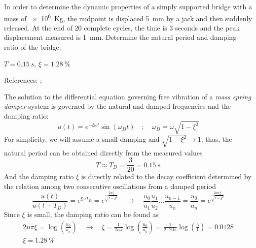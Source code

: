 
\begin{Exercise}[label={free_vibration}]
In order to determine the dynamic properties of a simply supported bridge with a mass of \qty{e6}{Kg}, the midpoint is displaced \qty{5}{mm} by a jack and then suddenly released. At the end of 20 complete cycles, the time is 3 seconds and the peak displacement measured is \qty{1}{mm}. Determine the natural period and damping ratio of the bridge.

\begin{center}
\end{center}

\shortAnswer $T=\SI{0.15}{s}$, $\xi=\SI{1.28}{\%}$

References: \cite[page 49]{chopra}; \cite[page 287]{blanco}
\end{Exercise}



\begin{Answer}[ref={free_vibration}]
The solution to the differential equation governing free vibration of a \emph{mass spring damper} system is governed by the natural and damped frequencies and the damping ratio:
$$
u(t) = e^{-\xi\omega t}\sin(\omega_D t) \quad ; \quad \omega_D = \omega\sqrt{1-\xi^2}
$$
For simplicity, we will assume a small damping and $\sqrt{1-\xi^2}\rightarrow1$, thus, the natural period can be obtained directly from the measured values
$$
T \approx T_D = \frac{3}{20} = \SI{0.15}{s}
$$
And the damping ratio $\xi$ is directly related to the decay coefficient determined by the relation among two consecutive oscillations from a damped period
$$
\frac{u(t)}{u(t+T_D)} = e^{\xi\omega T_D} = e^{\frac{2\pi\xi}{\sqrt{1-\xi^2}}} \quad \rightarrow \quad
\frac{u_0}{u_1} \frac{u_1}{u_2} \dots \frac{u_{n-1}}{u_n} = \frac{u_0}{u_n} = e^{\frac{2n\pi\xi}{\sqrt{1-\xi^2}}}
$$
Since $\xi$ is small, the damping ratio can be found as
\begin{align*}
2n\pi\xi = \log\left(\frac{u_0}{u_n}\right) \quad \rightarrow \quad
\xi = \frac{1}{2n\pi} \log\left(\frac{u_0}{u_n}\right) = \frac{1}{2\cdot20\pi} \log\left(\frac{5}{1}\right) = 0.0128 \\
\xi = \SI{1.28}{\%}
\end{align*}    

\end{Answer}